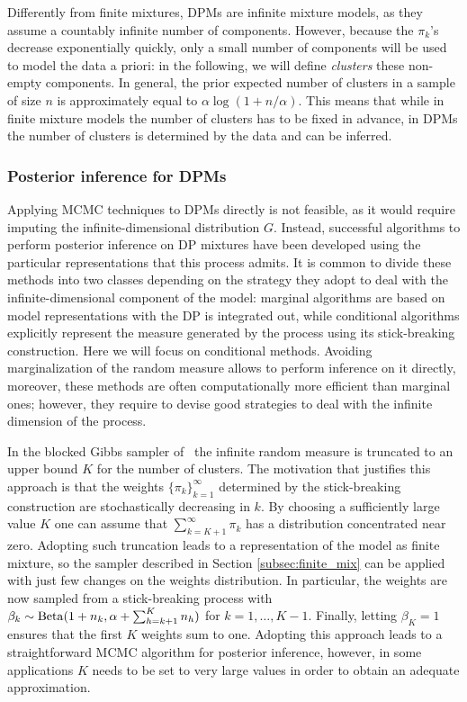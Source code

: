 Differently from finite mixtures, DPMs are infinite mixture models, as they assume a countably infinite number of components. 
However, because the $\pi_k$'s decrease exponentially quickly, only a small number of components will be used to model the
data a priori: in the following, we will define \textit{clusters} these non-empty components. In general, the prior expected number of clusters in a sample of size $n$ is approximately equal to $\alpha \log(1 + n/\alpha)$.
This means that while in finite mixture models the number of clusters has to be fixed in advance, in DPMs the number of clusters is determined by the data and can be inferred.

\subsubsection*{Posterior inference for DPMs}
Applying MCMC techniques to DPMs directly is not feasible, as it would require imputing the infinite-dimensional distribution $G$. Instead, successful algorithms to perform posterior inference on DP mixtures have been developed using the particular representations that this process admits. 
It is common to divide these methods into two classes depending on the strategy they adopt to deal with the infinite-dimensional component of the model: marginal algorithms are based on model representations with the DP is integrated out, while conditional algorithms explicitly represent the measure generated by the process using its stick-breaking construction.
Here we will focus on conditional methods. Avoiding marginalization of the random measure allows to perform inference on it directly, moreover, these methods are often computationally more efficient than marginal ones; however, they require to devise good strategies to deal with the infinite dimension of the process.

In the blocked Gibbs sampler of~\citet{ishwaran2001} the infinite random measure is truncated to an upper bound $K$ for the number of clusters. The motivation that justifies this approach is that the weights $\{\pi_k\}_{k=1}^{\infty}$ determined by the stick-breaking construction are stochastically decreasing in $k$. By choosing a sufficiently large value $K$ one can assume that $\sum_{k=K+1}^{\infty} \pi_k$ has a distribution concentrated near zero.
Adopting such truncation leads to a representation of the model as finite mixture, so the sampler described in Section \ref{subsec:finite_mix} can be applied with just few changes on the weights distribution. In particular, the weights are now sampled from a stick-breaking process with $\beta_k \sim \mathrm{Beta}(1+n_k, \alpha + \sum_{h=k+1}^K n_h)$ for $k = 1,\dots,K-1$. Finally, letting $\beta_K = 1$ ensures that the first $K$ weights sum to one. Adopting this approach leads to a straightforward MCMC algorithm for posterior inference, however, in some applications $K$ needs to be set to very large values in order to obtain an adequate approximation.

